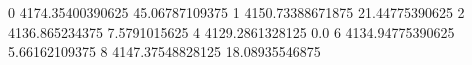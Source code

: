 0 4174.35400390625 45.06787109375
1 4150.73388671875 21.44775390625
2 4136.865234375 7.5791015625
4 4129.2861328125 0.0
6 4134.94775390625 5.66162109375
8 4147.37548828125 18.08935546875

